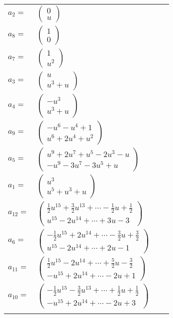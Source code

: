 \documentclass[1p]{elsarticle_modified}
\theoremstyle{definition}
\begin{document}
\begin{tabular}{m{7pt} m{180pt} m{7pt} m{180pt} }
\flushright $a_{2}=$&$\begin{pmatrix}0\\u\end{pmatrix}$ \\
\flushright $a_{8}=$&$\begin{pmatrix}1\\0\end{pmatrix}$ \\
\flushright $a_{7}=$&$\begin{pmatrix}1\\u^2\end{pmatrix}$ \\
\flushright $a_{3}=$&$\begin{pmatrix}u\\u^3+u\end{pmatrix}$ \\
\flushright $a_{4}=$&$\begin{pmatrix}- u^3\\u^3+u\end{pmatrix}$ \\
\flushright $a_{9}=$&$\begin{pmatrix}- u^6- u^4+1\\u^6+2 u^4+u^2\end{pmatrix}$ \\
\flushright $a_{5}=$&$\begin{pmatrix}u^9+2 u^7+u^5-2 u^3- u\\- u^9-3 u^7-3 u^5+u\end{pmatrix}$ \\
\flushright $a_{1}=$&$\begin{pmatrix}u^3\\u^5+u^3+u\end{pmatrix}$ \\
\flushright $a_{12}=$&$\begin{pmatrix}\frac{1}{2} u^{15}+\frac{3}{2} u^{13}+\cdots-\frac{1}{2} u+\frac{1}{2}\\u^{15}-2 u^{14}+\cdots+3 u-3\end{pmatrix}$ \\
\flushright $a_{6}=$&$\begin{pmatrix}-\frac{1}{2} u^{15}+2 u^{14}+\cdots-\frac{3}{2} u+\frac{3}{2}\\u^{15}-2 u^{14}+\cdots+2 u-1\end{pmatrix}$ \\
\flushright $a_{11}=$&$\begin{pmatrix}\frac{1}{2} u^{15}-2 u^{14}+\cdots+\frac{5}{2} u-\frac{3}{2}\\- u^{15}+2 u^{14}+\cdots-2 u+1\end{pmatrix}$ \\
\flushright $a_{10}=$&$\begin{pmatrix}-\frac{1}{2} u^{15}-\frac{3}{2} u^{13}+\cdots+\frac{1}{2} u+\frac{1}{2}\\- u^{15}+2 u^{14}+\cdots-2 u+3\end{pmatrix}$\\&\end{tabular}
\end{document}
